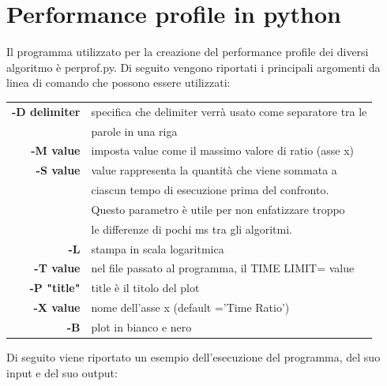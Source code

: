\chapter{Performance profile in python}\label{perf_profile_py}
Il programma utilizzato per la creazione del performance profile dei diversi algoritmo è perprof.py\cite{salvagnin_perf}. Di seguito vengono riportati i principali argomenti da linea di comando che possono essere utilizzati:

\begin{table}[h]
\centering
\begin{tabular}{|r|l|}
\hline
\textbf{-D delimiter} & {specifica che delimiter verrà usato come separatore tra le}\\
& {parole in una riga}\\
\hline
\textbf{-M value} & {imposta value come il massimo valore di ratio (asse x)}\\
\hline
\textbf{-S value} & {value rappresenta la quantità che viene sommata a}\\
& {ciascun tempo di esecuzione prima del confronto.}\\
& {Questo parametro è utile per non enfatizzare troppo}\\
& {le differenze di pochi ms tra gli algoritmi.}\\
\hline
\textbf{-L} & {stampa in scala logaritmica}\\
\hline
\textbf{-T value} & {nel file passato al programma, il TIME LIMIT= value}\\
\hline
\textbf{-P "title"} & {title è il titolo del plot}\\
\hline
\textbf{-X value} & {nome dell'asse x (default ='Time Ratio')}\\
\hline
\textbf{-B} & {plot in bianco e nero}\\
\hline
\end{tabular}
\end{table}
Di seguito viene riportato un esempio dell'esecuzione del programma, del suo input e del suo output:
